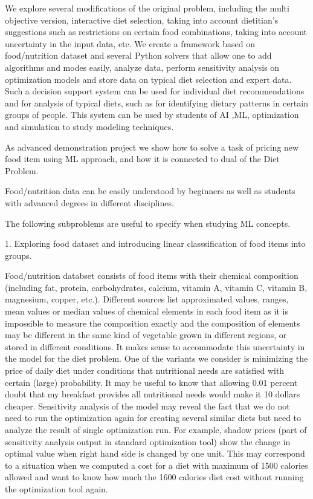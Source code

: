 \documentclass{article} %
\begin{document}
We explore several modifications of the original problem, including the multi objective version, interactive diet selection, taking into account dietitian’s suggestions such as restrictions on certain food combinations, taking into account uncertainty in the input data, etc. We create a framework based on food/nutrition dataset and several Python solvers that allow one to add algorithms and modes easily, analyze data, perform sensitivity analysis on optimization models and store data on typical diet selection and expert data. Such a decision support system can be used for individual diet recommendations and for analysis of typical diets, such as for identifying dietary patterns in certain groups of people. This system can be used by students of AI ,ML,  optimization and simulation to study modeling techniques. 

As advanced demonstration project we show how to solve a task of pricing new food item using ML approach, and how it is connected to dual of the Diet Problem. 

Food/nutrition data can be easily understood by beginners as well as students with advanced degrees in different disciplines.  


The following subproblems are useful to specify when studying ML concepts. 

1. Exploring food dataset and introducing linear classsification of food items into groups. 

Food/nutrition databset consists of food items with their chemical composition (including fat, protein, carbohydrates, calcium, vitamin A, vitamin C, vitamin B, magnesium, copper, etc.). Different sources list approximated values, ranges, mean values or median values of chemical elements in each food item as it is impossible to measure the composition exactly and the composition of elements may be different in the same kind of vegetable grown in different regions, or stored in different conditions. It makes sense to accommodate this uncertainty in the model for the diet problem. One of the variants we consider is minimizing the price of daily diet under conditions that nutritional needs are satisfied with certain (large) probability. It may be useful to know that allowing 0.01 percent  doubt that my breakfast provides all nutritional needs would make it 10 dollars  cheaper. 
Sensitivity analysis of the model may reveal the fact that we do not need to run the optimization again for creating several similar diets but need to analyze the result of single optimization run. For example, shadow prices (part of sensitivity analysis output in standard optimization tool) show the change in optimal value when right hand side is changed by one unit. This may correspond to a situation when we computed a cost for a diet with maximum of 1500 calories allowed and want to know how much the 1600 calories diet cost without running the optimization tool again.  
\end{document}
